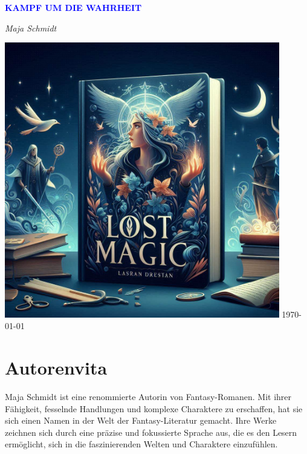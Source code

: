 \documentclass[12pt]{article} %
\begin{document}
\begin{titlepage}
    \centering
    \vspace*{3cm}
    {\Huge\bfseries\textcolor{blue}{\MakeUppercase{ Kampf um die Wahrheit }}\par} %
    \vspace{0.5cm} %
    {\Large\textit{ Maja Schmidt }\par} %
    \vfill
    \includegraphics[width=0.9\textwidth]{ cover.jpg } %
    \vfill
    \today
\end{titlepage}

\section*{Autorenvita}
\vspace{4cm} %
\begin{minipage}{\textwidth}
    Maja Schmidt ist eine renommierte Autorin von Fantasy-Romanen. Mit ihrer Fähigkeit, fesselnde Handlungen und komplexe Charaktere zu erschaffen, hat sie sich einen Namen in der Welt der Fantasy-Literatur gemacht. Ihre Werke zeichnen sich durch eine präzise und fokussierte Sprache aus, die es den Lesern ermöglicht, sich in die faszinierenden Welten und Charaktere einzufühlen.
\end{minipage}
\end{document}
